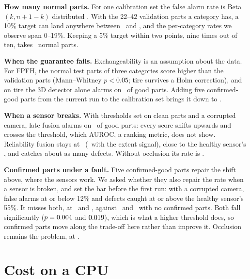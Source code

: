 \documentclass[10pt,twocolumn,letterpaper]{article}
\begin{document}
\begin{table}[t]
\centering\small\setlength{\tabcolsep}{4pt}
\resizebox{\linewidth}{!}{}
\caption{False alarms on good parts / defective parts caught, $\alpha = 0.1$, thresholds from clean validation parts, mean over categories (and corruptions).}
\label{tab:alarms}
\end{table}

\textbf{How many normal parts.} For one calibration set the false alarm rate is Beta$(k, n+1-k)$ distributed \citep{vovk2012conditional}. With the 22--42 validation parts a category has, a 10\% target can land anywhere between \betaLow\ and \betaHigh, and the per-category rates we observe span 0--19\%. Keeping a 5\% target within two points, nine times out of ten, takes \minCalibration\ normal parts.

\textbf{When the guarantee fails.} Exchangeability is an assumption about the data. For FPFH, the normal test parts of three categories score higher than the validation parts (Mann--Whitney $p<0.05$; tire survives a Holm correction), and on tire the 3D detector alone alarms on \tireFalse\ of good parts. Adding five confirmed-good parts from the current run to the calibration set brings it down to \tireFive.

\textbf{When a sensor breaks.} With thresholds set on clean parts and a corrupted camera, late fusion alarms on \lateRgbFalse\ of good parts: every score shifts upwards and crosses the threshold, which AUROC, a ranking metric, does not show. Reliability fusion stays at \reliableRgbFalse\ (\extentRgbFalse\ with the extent signal), close to the healthy sensor's \healthyRgbFalse, and catches about as many defects. Without occlusion its rate is \reliableRgbFalseNoOcclusion.

\textbf{Confirmed parts under a fault.} Five confirmed-good parts repair the shift above, where the sensors work. We asked whether they also repair the rate when a sensor is broken, and set the bar before the first run: with a corrupted camera, false alarms at or below 12\% and defects caught at or above the healthy sensor's 55\%. It misses both, at \recalFalse\ and \recalCaught, against \recalNoneFalse\ and \recalNoneCaught\ with no confirmed parts. Both fall significantly ($p=0.004$ and $0.019$), which is what a higher threshold does, so confirmed parts move along the trade-off here rather than improve it. Occlusion remains the problem, at \recalOcclusion.

\section{Cost on a CPU}
\label{sec:cost}
\end{document}
